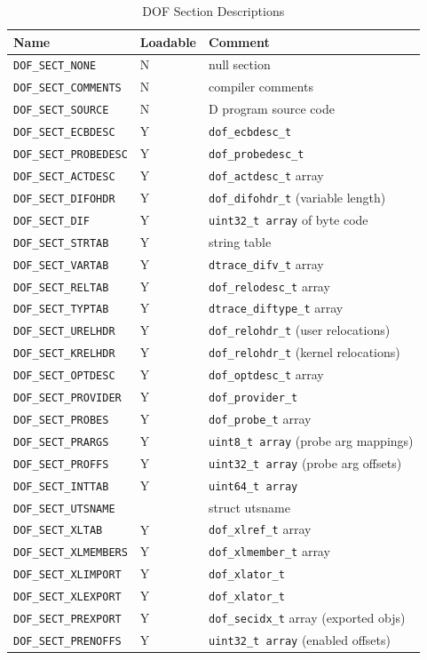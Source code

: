 \begin{table}
  \centering
\begin{tabular}{|l|l|l|}
\hline
  Name & Loadable & Comment\\
\hline
\verb|DOF_SECT_NONE| & N & null section\\
\verb|DOF_SECT_COMMENTS| & N & compiler comments\\
\verb|DOF_SECT_SOURCE| & N & D program source code\\
\verb|DOF_SECT_ECBDESC| & Y & \verb|dof_ecbdesc_t|\\
\verb|DOF_SECT_PROBEDESC| & Y & \verb|dof_probedesc_t|\\
\verb|DOF_SECT_ACTDESC| & Y & \verb|dof_actdesc_t| array\\
\verb|DOF_SECT_DIFOHDR| & Y & \verb|dof_difohdr_t| (variable length)\\
\verb|DOF_SECT_DIF| & Y & \verb|uint32_t array| of byte code\\
\verb|DOF_SECT_STRTAB| & Y & string table\\
\verb|DOF_SECT_VARTAB| & Y & \verb|dtrace_difv_t| array\\
\verb|DOF_SECT_RELTAB| & Y & \verb|dof_relodesc_t| array\\
\verb|DOF_SECT_TYPTAB| & Y & \verb|dtrace_diftype_t| array\\
\verb|DOF_SECT_URELHDR| & Y & \verb|dof_relohdr_t| (user relocations)\\
\verb|DOF_SECT_KRELHDR| & Y & \verb|dof_relohdr_t| (kernel relocations)\\
\verb|DOF_SECT_OPTDESC| & Y & \verb|dof_optdesc_t| array\\
\verb|DOF_SECT_PROVIDER| & Y & \verb|dof_provider_t|\\
\verb|DOF_SECT_PROBES| & Y & \verb|dof_probe_t| array\\
\verb|DOF_SECT_PRARGS| & Y & \verb|uint8_t array| (probe arg mappings)\\
\verb|DOF_SECT_PROFFS| & Y & \verb|uint32_t array| (probe arg offsets)\\
\verb|DOF_SECT_INTTAB| & Y & \verb|uint64_t array|\\
\verb|DOF_SECT_UTSNAME| &  & struct utsname\\
\verb|DOF_SECT_XLTAB| & Y & \verb|dof_xlref_t| array\\
\verb|DOF_SECT_XLMEMBERS| & Y & \verb|dof_xlmember_t| array\\
\verb|DOF_SECT_XLIMPORT| & Y & \verb|dof_xlator_t|\\
\verb|DOF_SECT_XLEXPORT| & Y & \verb|dof_xlator_t|\\
\verb|DOF_SECT_PREXPORT| & Y & \verb|dof_secidx_t| array (exported objs)\\
\verb|DOF_SECT_PRENOFFS| & Y & \verb|uint32_t array| (enabled offsets)\\
\hline
\end{tabular}
  \caption{DOF Section Descriptions}
  \label{tab:dof-sections}
\end{table}


